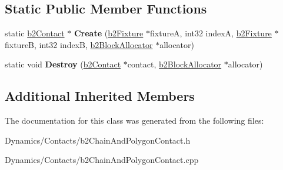 \subsection*{Static Public Member Functions}
\begin{DoxyCompactItemize}
\item 
\mbox{\label{classb2ChainAndPolygonContact_a03e9021485104ae8f485f986703fcd85}} 
static \mbox{\hyperlink{classb2Contact}{b2\+Contact}} $\ast$ {\bfseries Create} (\mbox{\hyperlink{classb2Fixture}{b2\+Fixture}} $\ast$fixtureA, int32 indexA, \mbox{\hyperlink{classb2Fixture}{b2\+Fixture}} $\ast$fixtureB, int32 indexB, \mbox{\hyperlink{classb2BlockAllocator}{b2\+Block\+Allocator}} $\ast$allocator)
\item 
\mbox{\label{classb2ChainAndPolygonContact_aa31bf71d64dd78583505b6da76ef289c}} 
static void {\bfseries Destroy} (\mbox{\hyperlink{classb2Contact}{b2\+Contact}} $\ast$contact, \mbox{\hyperlink{classb2BlockAllocator}{b2\+Block\+Allocator}} $\ast$allocator)
\end{DoxyCompactItemize}
\subsection*{Additional Inherited Members}


The documentation for this class was generated from the following files\+:\begin{DoxyCompactItemize}
\item 
Dynamics/\+Contacts/b2\+Chain\+And\+Polygon\+Contact.\+h\item 
Dynamics/\+Contacts/b2\+Chain\+And\+Polygon\+Contact.\+cpp\end{DoxyCompactItemize}
